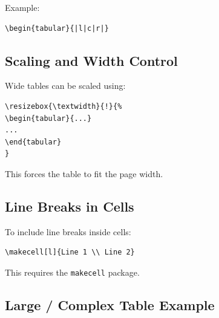 Example:
\begin{verbatim}
\begin{tabular}{|l|c|r|}
\end{verbatim}

\subsection{Scaling and Width Control}

Wide tables can be scaled using:

\begin{verbatim}
\resizebox{\textwidth}{!}{%
\begin{tabular}{...}
...
\end{tabular}
}
\end{verbatim}

This forces the table to fit the page width.

\subsection{Line Breaks in Cells}

To include line breaks inside cells:

\begin{verbatim}
\makecell[l]{Line 1 \\ Line 2}
\end{verbatim}

This requires the \texttt{makecell} package.

\subsection{Large / Complex Table Example}

